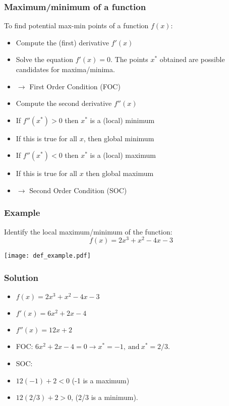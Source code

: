 \documentclass[xcolor=dvipsnames]{beamer} %
\begin{document}
\begin{frame}
\frametitle{Maximum/minimum of a function}
\begin{scriptsize}
To find potential max-min points of a function $f(x)$:
\begin{itemize}
    \setlength\itemsep{1em}
    \item Compute the (first) derivative $f'(x)$
    \item Solve the equation $f'(x) = 0$. The points $x^*$ obtained are possible candidates for maxima/minima. %
    \item[] \textcolor{dark_red}{$\longrightarrow$ First Order Condition (FOC)}
    \item Compute the second derivative $f''(x)$ %
    \item If $f''(x^*) > 0$ then $x^*$ is a (local) minimum
    \item[] If this is true for all $x$, then global minimum
    \item If $f''(x^*) < 0$ then $x^*$ is a (local) maximum
    \item[] If this is true for all $x$ then global maximum
    \item[] \textcolor{dark_red}{$\longrightarrow$ Second Order Condition (SOC)}
\end{itemize}
\end{scriptsize}
\end{frame}

\begin{frame}
\frametitle{Example}
Identify the local maximum/minimum of the function: $$ f(x) = 2x^3 + x^2 - 4x -3 $$
\begin{center}
\texttt{[image: def\_example.pdf]}
\end{center}
\end{frame}

\begin{frame}
\frametitle{Solution}
\begin{itemize}
    \itemsep\setlength{1em}
\item $f(x) = 2x^3 + x^2 - 4x - 3$
\item $f'(x) = 6x^2 + 2x - 4$
\item $f''(x) = 12x + 2$
\item FOC: $6x^2 + 2x - 4 = 0 \rightarrow x^* = -1, ~\textrm{and}~ x^* = 2/3$.
\item SOC: 
\item[] $12(-1) + 2 < 0$ (-1 is a maximum)
\item[] $12(2/3) + 2 > 0$, (2/3 is a minimum). 
\end{itemize}
\end{frame}
\end{document}
